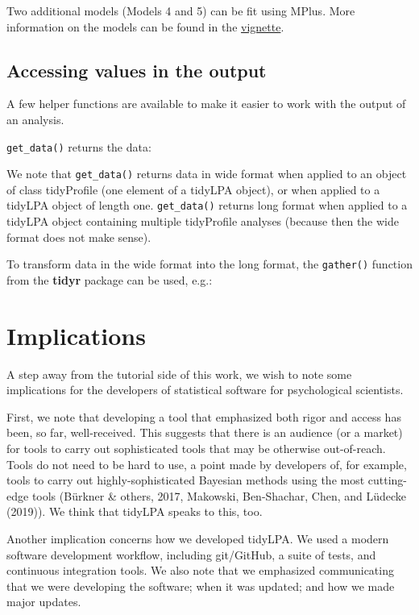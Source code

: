 \documentclass[man]{apa6}
\begin{document}
Two additional models (Models 4 and 5) can be fit using MPlus. More information
on the models can be found in the
\href{https://data-edu.github.io/tidyLPA/articles/Introduction_to_tidyLPA.html}{vignette}.

\hypertarget{accessing-values-in-the-output}{%
\subsection{Accessing values in the output}\label{accessing-values-in-the-output}}

A few helper functions are available to make it easier to work with the output
of an analysis.

\texttt{get\_data()} returns the data:

We note that \texttt{get\_data()} returns data in wide format when applied to an object
of class tidyProfile (one element of a tidyLPA object), or when applied to a
tidyLPA object of length one. \texttt{get\_data()} returns long format when applied to a
tidyLPA object containing multiple tidyProfile analyses (because then the wide
format does not make sense).

To transform data in the wide format into the long format, the \texttt{gather()}
function from the \textbf{tidyr} package can be used, e.g.:

\hypertarget{implications}{%
\section{Implications}\label{implications}}

A step away from the tutorial side of this work, we wish to note some implications
for the developers of statistical software for psychological scientists.

First, we note that developing a tool that emphasized both rigor and access has
been, so far, well-received. This suggests that there is an audience (or a
market) for tools to carry out sophisticated tools that may be otherwise
out-of-reach. Tools do not need to be hard to use, a point made by developers
of, for example, tools to carry out highly-sophisticated Bayesian methods using
the most cutting-edge tools (Bürkner \& others, 2017, Makowski, Ben-Shachar, Chen, and Lüdecke (2019)). We think
that tidyLPA speaks to this, too.

Another implication concerns how we developed tidyLPA. We used a modern software
development workflow, including git/GitHub, a suite of tests, and continuous
integration tools. We also note that we emphasized communicating that we were
developing the software; when it was updated; and how we made major updates.
\end{document}
